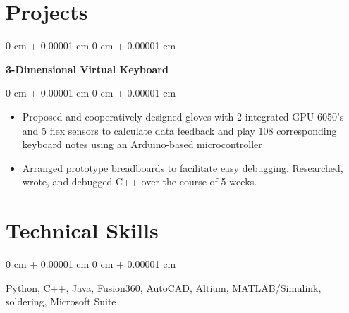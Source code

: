 \documentclass[10pt, letterpaper]{article}
\newenvironment{highlights}{
    \begin{itemize}[
        topsep=0.10 cm,
        parsep=0.10 cm,
        partopsep=0pt,
        itemsep=0pt,
        leftmargin=0 cm + 10pt
    ]
}{
    \end{itemize}
} %
\newenvironment{onecolentry}{
    \begin{adjustwidth}{
        0 cm + 0.00001 cm
    }{
        0 cm + 0.00001 cm
    }
}{
    \end{adjustwidth}
} %
\newenvironment{twocolentry}[2][]{
    \onecolentry
    \def\secondColumn{#2}
    \setcolumnwidth{\fill, 4.5 cm}
    \begin{paracol}{2}
}{
    \switchcolumn \raggedleft \secondColumn
    \end{paracol}
    \endonecolentry
} %
\begin{document}
    
    \section{Projects}



        
        \begin{twocolentry}{
    
        }
            \textbf{3-Dimensional Virtual Keyboard}\end{twocolentry}

        \vspace{0.10 cm}
        \begin{onecolentry}
            \begin{highlights}
                \item Proposed and cooperatively designed gloves with 2 integrated GPU-6050's and 5 flex sensors to calculate data feedback and play
                108 corresponding keyboard notes using an Arduino-based microcontroller
                \item Arranged prototype breadboards to facilitate easy debugging. Researched, wrote, and debugged C++ over the
                course of 5 weeks.
            \end{highlights}
        \end{onecolentry}
    
    \section{Technical Skills}

        \begin{onecolentry}
            \item Python, C++, Java, Fusion360, AutoCAD, Altium, MATLAB/Simulink, soldering, Microsoft Suite
        \end{onecolentry}
\end{document}
